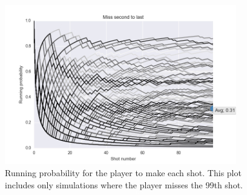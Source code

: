 \documentclass[12]{article}
\begin{document}
\begin{figure}
\begin{center}
  \includegraphics[width=0.9\textwidth]{figs/miss_99.png}
\end{center}
\caption{Running probability for the player to make each shot. This plot
         includes only simulations where the player misses the 99th shot.}
\label{fig:}
\end{figure}
\end{document}
